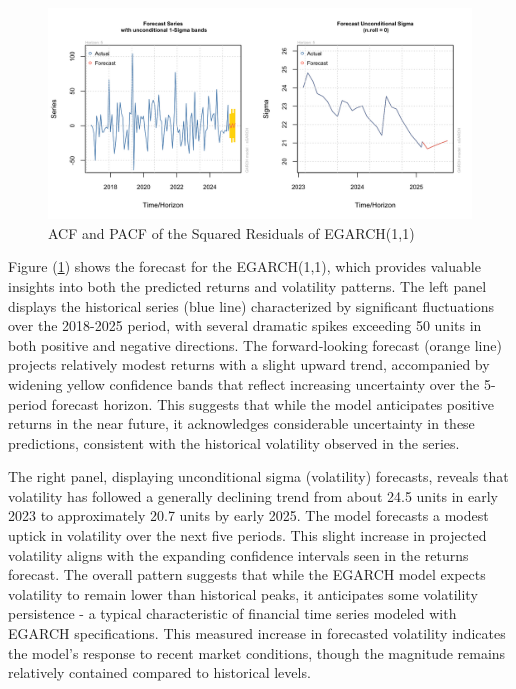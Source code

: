 \begin{figure}[!h]
	\centering
	\includegraphics[width=0.85\linewidth]{content/plots/GARCH_forecast.png}
	\caption{ACF and PACF of the Squared Residuals of EGARCH(1,1)}
	\label{fig:GARCH_forecast}
\end{figure}

Figure (\ref{fig:GARCH_forecast}) shows the forecast for the EGARCH(1,1), which provides valuable insights into both the predicted returns and volatility patterns. The left panel displays the historical series (blue line) characterized by significant fluctuations over the 2018-2025 period, with several dramatic spikes exceeding 50 units in both positive and negative directions. The forward-looking forecast (orange line) projects relatively modest returns with a slight upward trend, accompanied by widening yellow confidence bands that reflect increasing uncertainty over the 5-period forecast horizon. This suggests that while the model anticipates positive returns in the near future, it acknowledges considerable uncertainty in these predictions, consistent with the historical volatility observed in the series.

The right panel, displaying unconditional sigma (volatility) forecasts, reveals that volatility has followed a generally declining trend from about 24.5 units in early 2023 to approximately 20.7 units by early 2025. The model forecasts a modest uptick in volatility over the next five periods. This slight increase in projected volatility aligns with the expanding confidence intervals seen in the returns forecast. The overall pattern suggests that while the EGARCH model expects volatility to remain lower than historical peaks, it anticipates some volatility persistence - a typical characteristic of financial time series modeled with EGARCH specifications. This measured increase in forecasted volatility indicates the model’s response to recent market conditions, though the magnitude remains relatively contained compared to historical levels.

